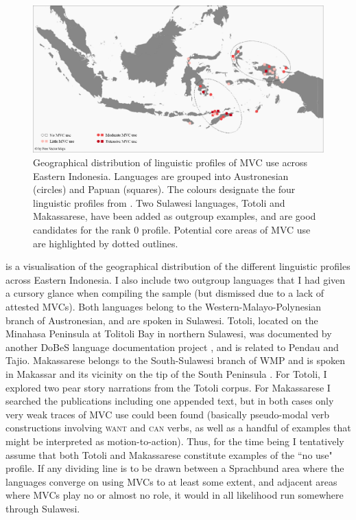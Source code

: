 \begin{figure}
\includegraphics[width=\textwidth]{figures/Map_overview_klein_MVCuse_alt.eps}
\caption[Geographical distribution of linguistic profiles of MVC use across Eastern Indonesia]{Geographical distribution of linguistic profiles of MVC use across Eastern Indonesia. Languages are grouped into Austronesian (circles) and Papuan (squares). The colours designate the four linguistic profiles from . Two Sulawesi languages, Totoli and Makassarese, have been added as outgroup examples, and are good candidates for the rank 0 profile. Potential core areas of MVC use are highlighted by dotted outlines.}\label{fig:map_profiles}
\end{figure}

 is a visualisation of the geographical distribution of the different linguistic profiles across Eastern Indonesia. I also include two outgroup languages that I had given a cursory glance when compiling the sample (but dismissed due to a lack of attested MVCs). Both languages belong to the Western-Malayo-Polynesian branch of Austronesian, and are spoken in Sulawesi. Totoli, located on the Minahasa Peninsula at Tolitoli Bay in northern Sulawesi, was documented by another DoBeS language documentation project \citep{leto2012totoli}, and is related to Pendau and Tajio. Makassarese belongs to the South-Sulawesi branch of WMP and is spoken in Makassar and its vicinity on the tip of the South Peninsula \citep{jukes2005makassar, jukes2006makassarese}. For Totoli, I explored two pear story narrations from the Totoli corpus. For Makassarese I searched the publications including one appended text, but in both cases only very weak traces of MVC use could been found (basically pseudo-modal verb constructions involving \textsc{want} and \textsc{can} verbs, as well as a handful of examples that might be interpreted as motion-to-action). Thus, for the time being I tentatively assume that both Totoli and Makassarese constitute examples of the ``no use" profile. If any dividing line is to be drawn between a Sprachbund area where the languages converge on using MVCs to at least some extent, and adjacent areas where MVCs play no or almost no role, it would in all likelihood run somewhere through Sulawesi.

